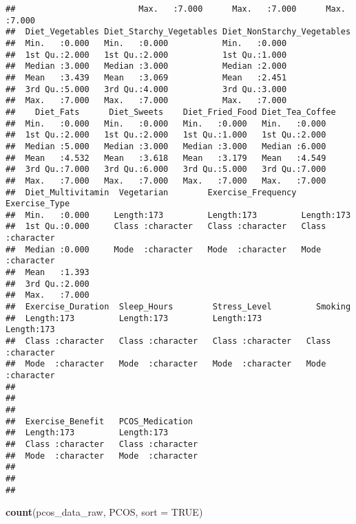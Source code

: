 \documentclass[
]{article}
\newenvironment{Shaded}{\begin{snugshade}}{\end{snugshade}}
\newcommand{\AttributeTok}[1]{\textcolor[rgb]{0.13,0.29,0.53}{#1}}
\newcommand{\ConstantTok}[1]{\textcolor[rgb]{0.56,0.35,0.01}{#1}}
\newcommand{\FunctionTok}[1]{\textcolor[rgb]{0.13,0.29,0.53}{\textbf{#1}}}
\newcommand{\NormalTok}[1]{#1}
\begin{document}
\begin{verbatim}
##                         Max.   :7.000      Max.   :7.000      Max.   :7.000  
##  Diet_Vegetables Diet_Starchy_Vegetables Diet_NonStarchy_Vegetables
##  Min.   :0.000   Min.   :0.000           Min.   :0.000             
##  1st Qu.:2.000   1st Qu.:2.000           1st Qu.:1.000             
##  Median :3.000   Median :3.000           Median :2.000             
##  Mean   :3.439   Mean   :3.069           Mean   :2.451             
##  3rd Qu.:5.000   3rd Qu.:4.000           3rd Qu.:3.000             
##  Max.   :7.000   Max.   :7.000           Max.   :7.000             
##    Diet_Fats      Diet_Sweets    Diet_Fried_Food Diet_Tea_Coffee
##  Min.   :0.000   Min.   :0.000   Min.   :0.000   Min.   :0.000  
##  1st Qu.:2.000   1st Qu.:2.000   1st Qu.:1.000   1st Qu.:2.000  
##  Median :5.000   Median :3.000   Median :3.000   Median :6.000  
##  Mean   :4.532   Mean   :3.618   Mean   :3.179   Mean   :4.549  
##  3rd Qu.:7.000   3rd Qu.:6.000   3rd Qu.:5.000   3rd Qu.:7.000  
##  Max.   :7.000   Max.   :7.000   Max.   :7.000   Max.   :7.000  
##  Diet_Multivitamin  Vegetarian        Exercise_Frequency Exercise_Type     
##  Min.   :0.000     Length:173         Length:173         Length:173        
##  1st Qu.:0.000     Class :character   Class :character   Class :character  
##  Median :0.000     Mode  :character   Mode  :character   Mode  :character  
##  Mean   :1.393                                                             
##  3rd Qu.:2.000                                                             
##  Max.   :7.000                                                             
##  Exercise_Duration  Sleep_Hours        Stress_Level         Smoking         
##  Length:173         Length:173         Length:173         Length:173        
##  Class :character   Class :character   Class :character   Class :character  
##  Mode  :character   Mode  :character   Mode  :character   Mode  :character  
##                                                                             
##                                                                             
##                                                                             
##  Exercise_Benefit   PCOS_Medication   
##  Length:173         Length:173        
##  Class :character   Class :character  
##  Mode  :character   Mode  :character  
##                                       
##                                       
## 
\end{verbatim}

\begin{Shaded}
\begin{Highlighting}[]
\FunctionTok{count}\NormalTok{(pcos\_data\_raw, PCOS, }\AttributeTok{sort =} \ConstantTok{TRUE}\NormalTok{)}
\end{Highlighting}
\end{Shaded}
\end{document}
